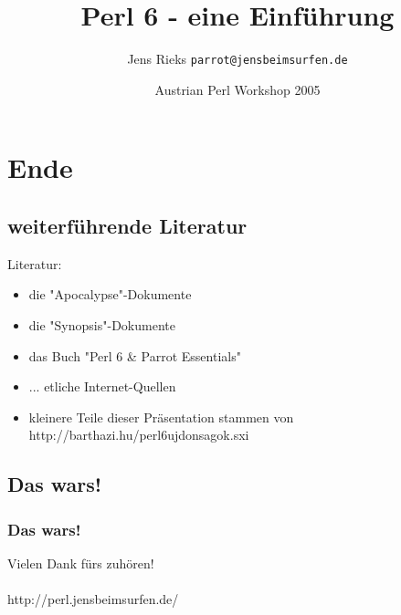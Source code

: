 \documentclass{beamer}
\title{Perl 6 - eine Einführung}
\author{Jens Rieks \texttt{parrot@jensbeimsurfen.de}}
\date{Austrian Perl Workshop 2005}
\begin{document}





 


% 

\section{Ende}
\subsection{weiterführende Literatur}
\begin{frame}
Literatur:
\begin{itemize}
\item die "Apocalypse"-Dokumente
\item die "Synopsis"-Dokumente
\item das Buch "Perl 6 \& Parrot Essentials"
\item ... etliche Internet-Quellen
\item kleinere Teile dieser Präsentation stammen von http://barthazi.hu/perl6ujdonsagok.sxi
\end{itemize}
\end{frame}
\subsection{Das wars!}
\begin{frame}
	\frametitle{Das wars!}
	Vielen Dank fürs zuhören!
	\ \\
	\ \\
	http://perl.jensbeimsurfen.de/
\end{frame}
\end{document}
